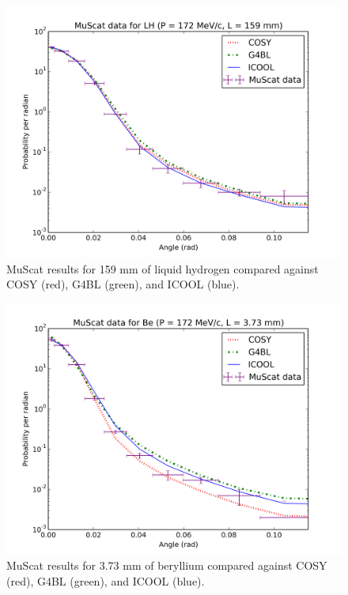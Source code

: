 \begin{figure}[H]
  \centering
    \includegraphics[width=\textwidth]{Figures/172.159.muscat} 
  \caption{MuScat results for 159 mm of liquid hydrogen compared against COSY (red), G4BL (green), and ICOOL (blue).}
  \label{fig:172.159.muscat}
\end{figure}

\begin{figure}[H]
  \centering
    \includegraphics[width=\textwidth]{Figures/172.3.73.muscat} 
  \caption{MuScat results for 3.73 mm of beryllium compared against COSY (red), G4BL (green), and ICOOL (blue).}
  \label{fig:172.3.73.muscat}
\end{figure}

